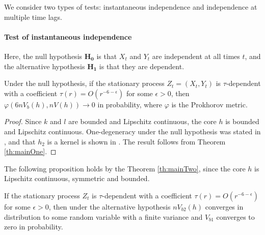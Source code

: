 We consider two types of tests: instantaneous independence and independence at multiple time lags.

\paragraph{Test of instantaneous independence}
Here, the null hypothesis  $\mathbf{H_0}$ is that  $X_t$ and $Y_t$ are independent at all times $t$,  and the alternative hypothesis $\mathbf{H_1}$ is that they are dependent. 

\begin{proposition}
\label{prop:null}
Under the null hypothesis, if the stationary process $Z_t=\left(X_t,Y_t\right)$ is $\tau$-dependent with a coefficient $\tau(r) = O\left(r^{-6-\epsilon}\right)$ for some $\epsilon>0$, then $\varphi(6 n V_b(h),n V(h))\to 0$ in probability, where $\varphi$ is the Prokhorov metric. 
\end{proposition}
\begin{proof}
Since $k$ and $l$ are bounded and Lipschitz continuous, the core $h$ is bounded  and Lipschitz continuous. One-degeneracy under the null hypothesis was stated in \cite[Theorem 2]{gretton_kernel_2008}, and that $h_2$ is a kernel is shown in \cite[section A.2, following eq. (11)]{gretton_kernel_2008}. The result follows from Theorem \ref{th:mainOne}.
\end{proof}

The following proposition holds by the Theorem \ref{th:mainTwo}, since the core $h$ is  Lipschitz continuous, symmetric and bounded.
\begin{proposition}
\label{prop:alternative}
If the stationary process $Z_t$ is $\tau$-dependent with a coefficient $\tau(r) = O\left(r^{-6-\epsilon}\right)$ for some $\epsilon>0$, then under the alternative hypothesis $n V_{b2}(h)$ converges in distribution to some random variable with a finite variance and $ V_{b1}$ converges to zero in probability. 
\end{proposition}


